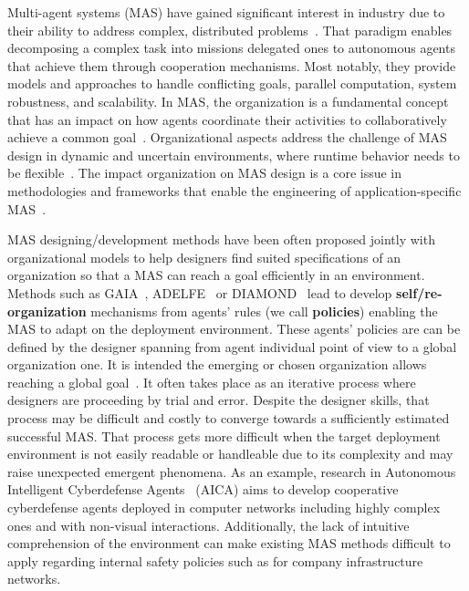 \documentclass[runningheads]{llncs}
\begin{document}
Multi-agent systems (MAS) have gained significant interest in industry due to their ability to address complex, distributed problems~\cite{Raileanu2023}.
That paradigm enables decomposing a complex task into missions delegated ones to autonomous agents that achieve them through cooperation mechanisms. Most notably, they provide models and approaches to handle conflicting goals, parallel computation, system robustness, and scalability.
In MAS, the organization is a fundamental concept that has an impact on how agents coordinate their activities to collaboratively achieve a common goal~\cite{Hubner2007}.
Organizational aspects address the challenge of MAS design in dynamic and uncertain environments, where runtime behavior needs to be flexible~\cite{Kathleen2020}. The impact organization on MAS design is a core issue in methodologies and frameworks that enable the engineering of application-specific MAS~\cite{Bakliwal2018}.

MAS designing/development methods have been often proposed jointly with organizational models to help designers find suited specifications of an organization so that a MAS can reach a goal efficiently in an environment. Methods such as GAIA~\cite{Wooldridge2000,Cernuzzi2014}, ADELFE~\cite{Mefteh2015} or DIAMOND~\cite{Jamont2015} lead to develop \textbf{self/re-organization} mechanisms from agents' rules (we call \textbf{policies}) enabling the MAS to adapt on the deployment environment.
These agents' policies are can be defined by the designer spanning from agent individual point of view to a global organization one. It is intended the emerging or chosen organization allows reaching a global goal~\cite{Picard2009}. It often takes place as an iterative process where designers are proceeding by trial and error. Despite the designer skills, that process may be difficult and costly to converge towards a sufficiently estimated successful MAS. That process gets more difficult when the target deployment environment is not easily readable or handleable due to its complexity and may raise unexpected emergent phenomena. As an example, research in Autonomous Intelligent Cyberdefense Agents~\cite{Kott2023} (AICA) aims to develop cooperative cyberdefense agents deployed in computer networks including highly complex ones and with non-visual interactions. Additionally, the lack of intuitive comprehension of the environment can make existing MAS methods difficult to apply regarding internal safety policies such as for company infrastructure networks.
\end{document}
